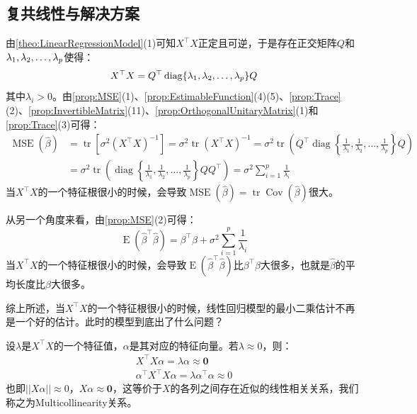 \subsection{复共线性与解决方案}
\begin{note}
	由\cref{theo:LinearRegressionModel}(1)可知$X^{\top}X$正定且可逆，于是存在正交矩阵$Q$和$\lambda_1, \lambda_2, \dots, \lambda_{p}$使得：
	\begin{equation*}
		X^{\top}X=Q^{\top}\operatorname{diag}\{\lambda_1, \lambda_2, \dots, \lambda_{p}\}Q
	\end{equation*}
	其中$\lambda_i>0$。由\cref{prop:MSE}(1)、\cref{prop:EstimableFunction}(4)(5)、\cref{prop:Trace}(2)、\cref{prop:InvertibleMatrix}(11)、\cref{prop:OrthogonalUnitaryMatrix}(1)和\cref{prop:Trace}(3)可得：
	\begin{align*}
		\operatorname{MSE}(\hat{\beta})&=\operatorname{tr}[\sigma^2(X^{\top}X)^{-1}]=\sigma^2\operatorname{tr}(X^{\top}X)^{-1}=\sigma^2\operatorname{tr}
		\left(Q^{\top}\operatorname{diag}\left\{\frac{1}{\lambda_1},\frac{1}{\lambda_2},\dots,\frac{1}{\lambda_{p}}\right\}Q\right) \\
		&=\sigma^2\operatorname{tr}
		\left(\operatorname{diag}\left\{\frac{1}{\lambda_1},\frac{1}{\lambda_2},\dots,\frac{1}{\lambda_{p}}\right\}QQ^{\top}\right)=\sigma^2\sum_{i=1}^{p}\frac{1}{\lambda_i}
	\end{align*}
	当$X^{\top}X$的一个特征根很小的时候，会导致$\operatorname{MSE}(\hat{\beta})=\operatorname{tr}\operatorname{Cov}(\hat{\beta})$很大。\par
	从另一个角度来看，由\cref{prop:MSE}(2)可得：
	\begin{equation*}
		\operatorname{E}(\hat{\beta}^{\top}\hat{\beta})=\beta^{\top}\beta+\sigma^2\sum_{i=1}^{p}\frac{1}{\lambda_i}
	\end{equation*}
	当$X^{\top}X$的一个特征根很小的时候，会导致$\operatorname{E}(\hat{\beta}^{\top}\hat{\beta})$比$\beta^{\top}\beta$大很多，也就是$\hat{\beta}$的平均长度比$\beta$大很多。\par
	综上所述，当$X^{\top}X$的一个特征根很小的时候，线性回归模型的最小二乘估计不再是一个好的估计。此时的模型到底出了什么问题？\par
	设$\lambda$是$X^{\top}X$的一个特征值，$\alpha$是其对应的特征向量。若$\lambda\approx0$，则：
	\begin{gather*}
		X^{\top}X\alpha=\lambda\alpha\approx\mathbf{0} \\
		\alpha^{\top}X^{\top}X\alpha=\lambda\alpha^{\top}\alpha\approx0
	\end{gather*}
	也即$||X\alpha||\approx0$，$X\alpha\approx\mathbf{0}$，这等价于$X$的各列之间存在近似的线性相关关系，我们称之为\gls{Multicollinearity}关系。\par

\end{note}
